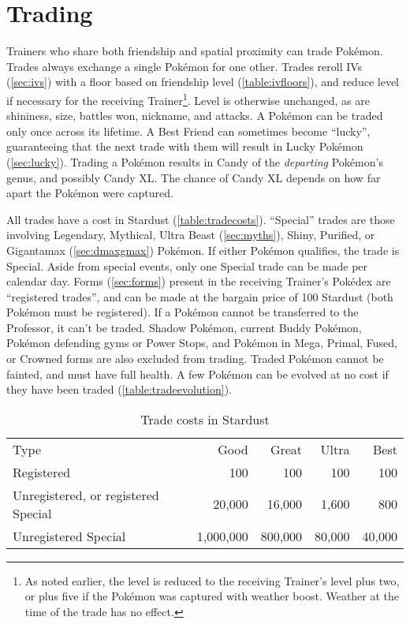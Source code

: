 \section{Trading}
\label{sec:trades}
Trainers who share both friendship and spatial proximity can trade Pokémon.
Trades always exchange a single Pokémon for one other.
Trades reroll IVs (\autoref{sec:ivs}) with a floor based on friendship level (\autoref{table:ivfloors}),
  and reduce level if necessary for the receiving Trainer\footnote{As noted earlier, the level is reduced
  to the receiving Trainer's level plus two, or plus five if the Pokémon was captured with weather boost.
  Weather at the time of the trade has no effect.}.
Level is otherwise unchanged, as are shininess, size, battles won, nickname, and attacks.
A Pokémon can be traded only once across its lifetime.
A Best Friend can sometimes become ``lucky'', guaranteeing that the next trade with
  them will result in Lucky Pokémon (\autoref{sec:lucky}).
Trading a Pokémon results in Candy of the \textit{departing} Pokémon's genus,
  and possibly Candy XL.
The chance of Candy XL depends on how far apart the Pokémon were captured.

All trades have a cost in Stardust (\autoref{table:tradecosts}).
``Special'' trades are those involving Legendary, Mythical, Ultra Beast (\autoref{sec:myths}),
  Shiny, Purified, or Gigantamax (\autoref{sec:dmaxgmax}) Pokémon.
If either Pokémon qualifies, the trade is Special.
Aside from special events, only one Special trade can be made per calendar day.
Forms (\autoref{sec:forms}) present in the receiving Trainer's Pokédex are
  ``registered trades'', and can be made at the bargain price of 100 Stardust
  (both Pokémon must be registered).
If a Pokémon cannot be transferred to the Professor, it can't be traded.
Shadow Pokémon, current Buddy Pokémon, Pokémon defending gyms or Power Stops, and Pokémon
 in Mega, Primal, Fused, or Crowned forms are also excluded from trading.
Traded Pokémon cannot be fainted, and must have full health.
A few Pokémon can be evolved at no cost if they have been traded (\autoref{table:tradeevolution}).
\begin{table}
\centering
\begin{tabular}{lrrrr}
Type & Good & Great & Ultra & Best\\
\Midrule
Registered & 100 & 100 & 100 & 100\\
Unregistered, or registered Special & 20,000 & 16,000 & 1,600 & 800\\
Unregistered Special & 1,000,000 & 800,000 & 80,000 & 40,000\\
\end{tabular}
\caption{Trade costs in Stardust}
\label{table:tradecosts}
\end{table}

